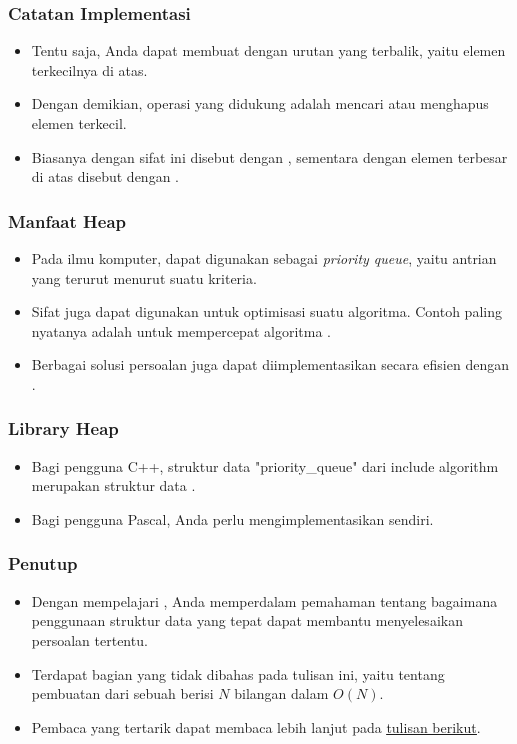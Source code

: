 \begin{frame}
\frametitle{Catatan Implementasi}
\begin{itemize}
  \item Tentu saja, Anda dapat membuat \pheap dengan urutan yang terbalik, yaitu elemen terkecilnya di atas.
  \item Dengan demikian, operasi yang didukung adalah mencari atau menghapus elemen terkecil.
  \item Biasanya \pheap dengan sifat ini disebut dengan , sementara \pheap dengan elemen terbesar di atas disebut dengan .
\end{itemize}
\end{frame}

\begin{frame}
\frametitle{Manfaat Heap}
\begin{itemize}
  \item Pada ilmu komputer, \pheap dapat digunakan sebagai \textit{priority queue}, yaitu antrian yang terurut menurut suatu kriteria.
  \item Sifat \pheap juga dapat digunakan untuk optimisasi suatu algoritma. Contoh paling nyatanya adalah untuk mempercepat algoritma .
  \item Berbagai solusi persoalan  juga dapat diimplementasikan secara efisien dengan \pheap.
\end{itemize}
\end{frame}

\begin{frame}
\frametitle{Library Heap}
\begin{itemize}
  \item Bagi pengguna C++, struktur data "priority\_queue" dari include algorithm merupakan struktur data \pheap.
  \item Bagi pengguna Pascal, Anda perlu mengimplementasikan \pheap sendiri.
\end{itemize}
\end{frame}

\begin{frame}
\frametitle{Penutup}
\begin{itemize}
  \item Dengan mempelajari \pheap, Anda memperdalam pemahaman tentang bagaimana penggunaan struktur data yang tepat dapat membantu menyelesaikan persoalan tertentu.
  \item Terdapat bagian yang tidak dibahas pada tulisan ini, yaitu tentang pembuatan \pheap dari sebuah \farray berisi $N$ bilangan dalam $O(N)$.
  \item Pembaca yang tertarik dapat membaca lebih lanjut pada \href{https://en.wikipedia.org/wiki/Heap\_\%28data\_structure\%29}{\underline{tulisan berikut}}.
\end{itemize}
\end{frame}




